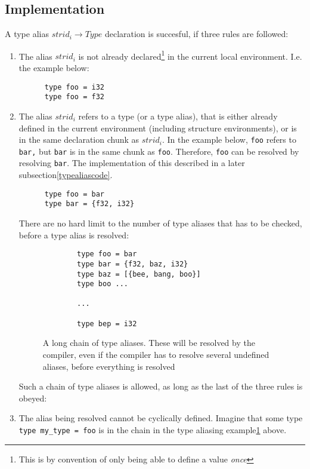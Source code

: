 \subsection{Implementation}\label{typealiasimplementation}
A type alias $strid_i \to Type$ declaration is succesful, if three rules are followed:
\begin{enumerate}
  \item The alias $strid_i$ is not already declared\footnote[]{This is by convention of
      only being able to define a value \textit{once}} in the current local
    environment. I.e. the example below:
    \begin{verbatim}
      type foo = i32
      type foo = f32
    \end{verbatim}
    
  \item The alias $strid_i$ refers to a type (or a type alias), that is either already
    defined in the current environment (including structure environments), or is
    in the same declaration chunk as $strid_i$. In the example below, \texttt{foo} refers
    to \texttt{bar,} but \texttt{bar} is in the same chunk as \texttt{foo}.
    Therefore, \texttt{foo} can be resolved by resolving \texttt{bar}. The implementation of this
    described in a later subsection\ref{typealiascode}.
    \begin{verbatim} 
      type foo = bar
      type bar = {f32, i32}
    \end{verbatim}
    There are no hard limit to the number of type aliases that has to be
    checked, before a type alias is resolved:
    \begin{figure}\label{longchain}
      \begin{verbatim} 
        type foo = bar
        type bar = {f32, baz, i32}
        type baz = [{bee, bang, boo}]
        type boo ...
  
        ...
  
        type bep = i32
        \end{verbatim}
      \caption{A long chain of type aliases. These will be resolved by the
        compiler, even if the compiler has to resolve several undefined aliases,
      before everything is resolved}
    \end{figure}
    Such a chain of type aliases is allowed, as long as the last of the three
    rules is obeyed:
  
    
  \item The alias being resolved cannot be cyclically defined.\label{cyclicaldefinitionerror}
    Imagine that some type \texttt{type my_type = foo} is in the chain in the
    type aliasing example\ref{longchain} above.\\


\end{enumerate}
